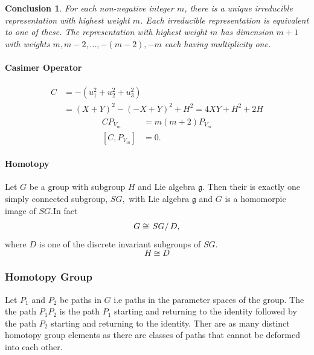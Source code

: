 \documentclass[aps,preprint]{revtex4}%
\newtheorem{conclusion}[theorem]{Conclusion}
\begin{document}
\begin{conclusion}
For each non-negative integer $m$, there is a unique irreducible
representation with highest weight $m$. Each irreducible representation is
equivalent to one of these. The representation with highest weight $m$ has
dimension $m+1$ with weights $m,m-2,\ldots,-(m-2),-m$ each having multiplicity one.
\end{conclusion}

\paragraph{Casimer Operator}%

\begin{align}
C  &  =-\left(  u_{1}^{2}+u_{2}^{2}+u_{3}^{2}\right) \\
&  =\left(  X+Y\right)  ^{2}-\left(  -X+Y\right)  ^{2}+H^{2}=4XY+H^{2}+2H
\end{align}%
\begin{align}
CP_{V_{m}}  &  =m\left(  m+2\right)  P_{V_{m}}\\
\left[  C,P_{V_{m}}\right]   &  =0.
\end{align}


\paragraph{Homotopy}

Let $G$ be a group with subgroup $H$ and Lie algebra $\mathfrak{g}$. Then
their is exactly one simply connected subgroup, $SG,$ with Lie algebra
$\mathfrak{g}$ and $G$ is a homomorpic image of $SG.$In fact
\begin{equation}
G\cong\left.  SG\right/  D,
\end{equation}
where $D$ is one of the discrete invariant subgroups of $SG.$
\begin{equation}
H\cong D
\end{equation}


\subsubsection{Homotopy Group}

Let $P_{1}$ and $P_{2}$ be paths in $G$ i.e paths in the parameter spaces of
the group. The the path $P_{1}P_{2}$ is the path $P_{1}$ starting and
returning to the identity followed by the path $P_{2}$ starting and returning
to the identity. Ther are as many distinct homotopy group elements as there
are classes of paths that cannot be deformed into each other.
\end{document}
